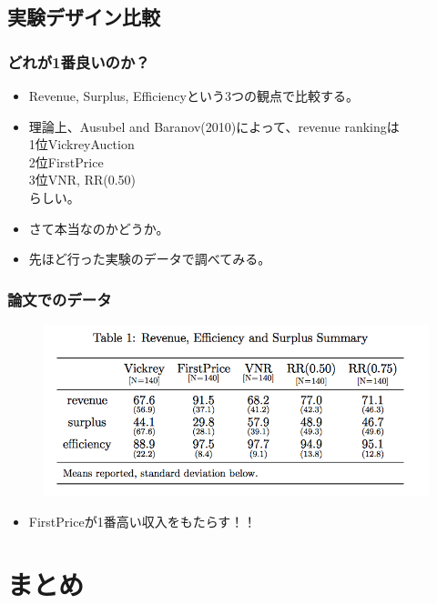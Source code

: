 \documentclass[dvipdfmx,12pt]{beamer}
\begin{document}
\subsection{実験デザイン比較}
\begin{frame}
\frametitle{どれが1番良いのか？}
\begin{itemize}\setlength{\parskip}{0.5em}
\item
Revenue, Surplus, Efficiencyという3つの観点で比較する。\pause
\item
理論上、Ausubel and Baranov(2010)によって、revenue rankingは\\
\pause
1位VickreyAuction\\
2位FirstPrice\\
3位VNR, RR(0.50)\\
らしい。\pause
\item
さて本当なのかどうか。\pause
\item
先ほど行った実験のデータで調べてみる。
\end{itemize}
\end{frame}

\begin{frame}
\frametitle{論文でのデータ}
\begin{figure}
\centering
\includegraphics[width=120mm]{result.png}
\label{fig:result}
\end{figure}
\begin{itemize}\setlength{\parskip}{0.5em}
\pause
\item
FirstPriceが1番高い収入をもたらす！！
\end{itemize}
\end{frame}

\section{まとめ}
\end{document}
